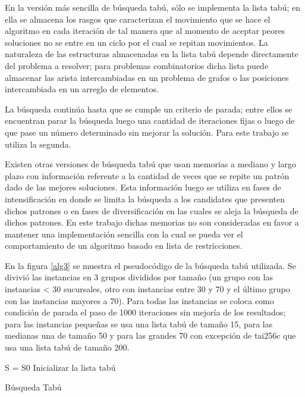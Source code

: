 \documentclass{ci5652}
\begin{document}
En la versión más sencilla de búsqueda tabú, sólo se implementa la lista tabú; en ella se almacena los rasgos que caracterizan el movimiento que se hace el algoritmo en cada iteración de tal manera que al momento de aceptar peores soluciones no se entre en un ciclo por el cual se repitan movimientos. La naturaleza de las estructuras almacenadas en la lista tabú depende directamente del problema a resolver; para problemas combinatorios dicha lista puede almacenar las arista intercambiadas en un problema de grafos o las posiciones intercambiada en un arreglo de elementos.

La búsqueda continúa hasta que se cumple un criterio de parada; entre ellos se encuentran parar la búsqueda luego una cantidad de iteraciones fijas o luego de que pase un número determinado sin mejorar la solución. Para este trabajo se utiliza la segunda.

Existen otras versiones de búsqueda tabú que usan memorias a mediano y largo plazo con información referente a la cantidad de veces que se repite un patrón dado de las mejores soluciones. Esta información luego se utiliza en fases de intensificación en donde se limita la búsqueda a los candidates que presenten dichos patrones o en fases de diversificación en las cuales se aleja la búsqueda de dichos patrones. En este trabajo dichas memorias no son consideradas en favor a mantener una implementación sencilla con la cual se pueda ver el comportamiento de un algoritmo basado en lista de restricciones. 

En la figura \ref{alg3} se muestra el pseudocódigo de la búsqueda tabú utilizada. Se divivió las instancias en 3 grupos divididos por tamaño (un grupo con las instancias < 30 sucursales, otro con instancias entre 30 y 70 y el último grupo con las instancias mayores a 70). Para todas las instancias se coloca como condición de parada el paso de 1000 iteraciones sin mejoría de los resultados; para las instancias pequeñas se usa una lista tabú de tamaño 15, para las medianas una de tamaño 50 y para las grandes 70 con excepción de tai256c que usa una lista tabú de tamaño 200.

\begin{algorithm}
 \label{alg3}
 \DontPrintSemicolon
 \vspace*{0.1cm}
 S = S0 
 Inicializar la lista tabú \;
 \vspace*{0.1cm}
 \caption{Búsqueda Tabú}
\end{algorithm}
\end{document}
